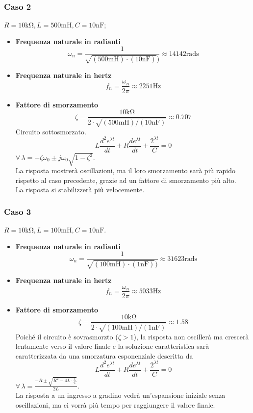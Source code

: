 \documentclass[a4paper,10pt]{article}
\begin{document}

\subsubsection{Caso 2}

\(R= 10 \si{\kilo \ohm}, L = 500 \si{\milli \henry}, C= 10 \si{\nano \farad}\);


\begin{itemize}
    \item \textbf{Frequenza naturale in radianti}
        \[\omega_n = \frac{1}{\sqrt{(500 \si{\milli \henry})\cdot(10 \si{\nano \farad})})} \approx 14142 \si{\radian \second}\]

    \item \textbf{Frequenza naturale in hertz}
        \[f_n = \frac{\omega_n}{2 \pi} \approx 2251 \si{\hertz}\]
    \item \textbf{Fattore di smorzamento}
        \[\zeta = \frac{10 \si{\kilo \ohm}}{2 \cdot \sqrt{(500 \si{\milli \henry})/(10 \si{\nano \farad})}} \approx 0.707\]
        Circuito sottosmorzato.
        \[L \frac{d^2 e^{\lambda t}}{dt}+R \frac{d e^{\lambda t}}{dt} + \frac{2^{\lambda t}}{C} =0\]
        \(\forall \, \lambda = -\zeta \omega_0 \pm j \omega_0 \sqrt{1- \zeta^2} \). \\
        La risposta mostrerà oscillazioni, ma il loro smorzamento sarà più rapido rispetto al caso precedente, grazie ad un fattore di smorzamento più alto. \\
        La risposta si stabilizzerà più velocemente.
\end{itemize}




\subsubsection{Caso 3}

\(R= 10 \si{\kilo \ohm}, L = 100 \si{\milli \henry}, C = 10 \si{\nano \farad}\).


\begin{itemize}
    \item \textbf{Frequenza naturale in radianti}
        \[\omega_n = \frac{1}{\sqrt{(100 \si{\milli \henry})\cdot(1 \si{\nano \farad})})} \approx 31623 \si{\radian \second}\]
    \item \textbf{Frequenza naturale in hertz}
        \[f_n = \frac{\omega_n}{2 \pi} \approx 5033 \si{\hertz}\]
    \item \textbf{Fattore di smorzamento}
        \[\zeta = \frac{10 \si{\kilo \ohm}}{2 \cdot \sqrt{(100 \si{\milli \henry})/(1 \si{\nano \farad})}} \approx 1.58\]
        Poiché il circuito è sovrasmorzto (\(\zeta > 1\)), la risposta non oscillerà ma crescerà lentamente verso il valore finale e la soluzione caratteristica sarà caratterizzata da una smorzatura esponenziale descritta da 
        \[L \frac{d^2 e^{\lambda t}}{dt}+R \frac{d e^{\lambda t}}{dt} + \frac{2^{\lambda t}}{C} =0\]
        \(\forall \, \lambda = \frac{-R \pm \sqrt{R^2 -4L \cdot \frac{1}{C}}}{2L}\).\\
        La risposta a un ingresso a gradino vedrà un'espansione iniziale senza oscillazioni, ma ci vorrà più tempo per raggiungere il valore finale.

\end{itemize}
\end{document}
